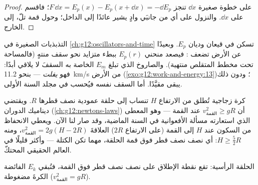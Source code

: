 \begin{proof}
على خطوة صغيرة $\dd x$ تنجز   $F\,\dd x = E_p(x) -
E_p(x + \dd x) = -\dd E_p$؛ فاقسم على $\dd x$. والنزول على أي من جانبَي
وادٍ يشير عائدًا إلى الداخل؛ وحول قمة تلّ، إلى الخارج.
\end{proof}

\begin{remark}\label{rem:g12:work-and-energy:escape}
التذبذبات الصغيرة في \cref{ch:g12:oscillators-and-time} تسكن
في قيعان وديان $E_p$. وبعيدًا عن الأرض تضعف : فيصعد
منحني $E_p(r)$ ببطء متزايد نحو سقف منتهٍ (فالمساحة
تحت مخطط  المتقلص منتهية). والصاروخ الذي تبلغ $E_m$ الخاصة به
السقفَ لا يلاقي  أبدًا: فهو
\emph{يفلت} --- بنحو \qty{11.2}{km/s} من
الأرض (\cref{exo:g12:work-and-energy:13})؛ ودون ذلك يبقى
مقيَّدًا. أما السقف نفسه فيُحسب في مجلد السنة الأولى.
\end{remark}

\begin{example}\label{ex:g12:work-and-energy:loop}
كرة زجاجية تُطلق من الارتفاع $H$ تنساب إلى حلقة عمودية نصف
قطرها $R$. ويقتضي ديناميك الدوران (\cref{ch:g12:newtons-laws})
أن $v_{\text{القمة}}^2 \geq gR$ عند القمة --- وهو المعطى الذي استعارته مسألة
الأفعوانية في السنة الماضية، وقد صار لنا الآن. ويعطي الانحفاظ من السكون عند $H$
إلى القمة (على الارتفاع $2R$) العلاقةَ $v_{\text{القمة}}^2 = 2g(H - 2R)$، ومنه
$H \geq \tfrac52 R$: أي نصف نصف قطر فوق قمة الحلقة، مهما تكن
الكتلة --- وأكثر قليلًا في العالم الحقيقي المحتكّ.
\end{example}

\begin{omfigure}

{\small الحلقة الرأسية: تقع نقطة الإطلاق على نصف نصف قطر فوق القمة،
فتُبقي $E_k$ الفائضة الكرةَ مضغوطة ($v_{\text{القمة}}^2 = gR$).}
\end{omfigure}


